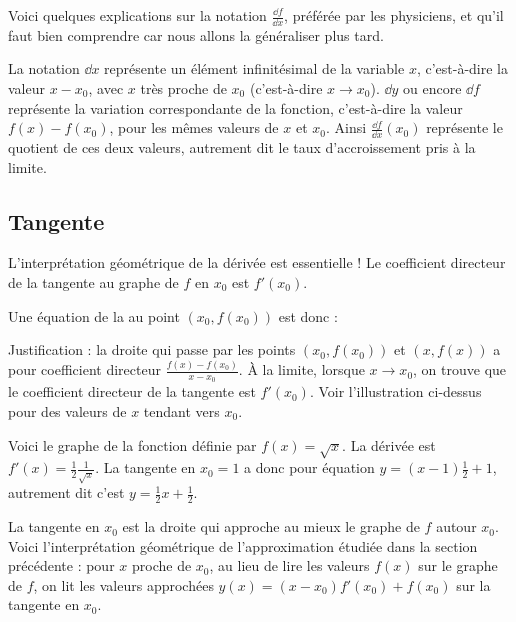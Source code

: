 \documentclass[11pt,class=report,crop=false]{standalone}
\begin{document}
\begin{remarque*}
Voici quelques explications sur la notation $\frac{\dd f}{\dd x}$, préférée par les physiciens, et qu'il faut bien comprendre car nous allons la généraliser plus tard.

La notation \og{}$\dd x$\fg{} représente un élément infinitésimal de la variable $x$, c'est-à-dire la valeur $x-x_0$, avec $x$ très proche de $x_0$ (c'est-à-dire $x \to x_0$). $\dd y$ ou encore $\dd f$ représente la variation correspondante de la fonction, c'est-à-dire la valeur $f(x)-f(x_0)$, pour les mêmes valeurs de $x$ et $x_0$. Ainsi $\frac{\dd f}{\dd x}(x_0)$ représente le quotient de ces deux valeurs, autrement dit le taux d'accroissement pris à la limite.


\end{remarque*}

\subsection{Tangente}


L'interprétation géométrique de la dérivée est essentielle !
Le coefficient directeur de la tangente au graphe de $f$ en $x_0$ est $f'(x_0)$.

Une équation de la  au point $(x_0,f(x_0))$ est donc :


Justification : la droite qui passe par les points $(x_0,f(x_0))$ et $(x,f(x))$ a pour coefficient directeur $\frac{f(x)-f(x_0)}{x-x_0}$.
\`A la limite, lorsque $x \to x_0$, on trouve que le coefficient directeur de la tangente est $f'(x_0)$. Voir l'illustration ci-dessus pour des valeurs de $x$ tendant vers $x_0$.

\begin{exemple}
Voici le graphe de la fonction définie par $f(x) = \sqrt{x}$.
La dérivée est $f'(x) = \frac12 \frac{1}{\sqrt{x}}$. La tangente en $x_0=1$ a donc pour équation 
$y = (x-1)\frac12 + 1$, autrement dit c'est $y = \frac12 x + \frac12$.


La tangente en $x_0$ est la droite qui \og{}approche\fg{} au mieux le graphe de $f$ autour $x_0$.
Voici l'interprétation géométrique de l'approximation étudiée dans la section précédente :
pour $x$ proche de $x_0$, au lieu de lire les valeurs $f(x)$ sur le graphe de $f$, on lit les valeurs approchées
$y(x) = (x-x_0) f'(x_0) + f(x_0)$ %
sur la tangente en $x_0$. %


\end{exemple}
\end{document}
